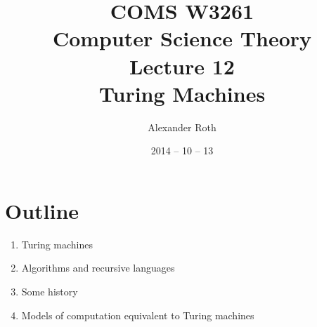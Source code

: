 \documentclass[]{article}
\begin{document}
\newcommand*{\xml}[1]{\texttt{<#1>}}
\theoremstyle{definition}
\newtheorem{thm}{Theorem}

\title{COMS W3261 \\ Computer Science Theory \\ Lecture 12\\ Turing Machines}
\author{Alexander Roth}
\date{2014 -- 10 -- 13}
\maketitle

\section*{Outline}
  \begin{enumerate}
    \item Turing machines
    \item Algorithms and recursive languages
    \item Some history
    \item Models of computation equivalent to Turing machines
  \end{enumerate}
  
\end{document}
